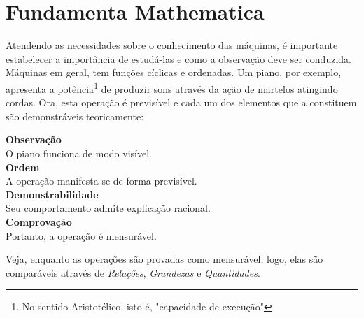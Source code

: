 \section{Fundamenta Mathematica}
Atendendo as necessidades sobre o conhecimento das máquinas, é importante 
estabelecer a importância de estudá-las e como a observação deve ser conduzida. 
Máquinas em geral, tem funções cíclicas e ordenadas. Um piano, por exemplo, 
apresenta a potência\footnote{No sentido Aristotélico, isto é, "capacidade de execução"} 
de produzir sons através da ação de martelos atingindo cordas. Ora, esta operação é 
previsível e cada um dos elementos que a constituem são demonstráveis teoricamente:

\begin{center}
\large{\textbf{Observação}}
\\ O piano funciona de modo visível. \\
\large{\textbf{Ordem}}
\\ A operação manifesta-se de forma previsível. \\
\large{\textbf{Demonstrabilidade}}
\\ Seu comportamento admite explicação racional. \\
\large{\textbf{Comprovação}}
\\ Portanto, a operação é mensurável. \\
    
\end{center}

Veja, enquanto as operações são provadas como mensurável, logo, elas são comparáveis 
através de \textit{Relações}, \textit{Grandezas} e \textit{Quantidades}.


